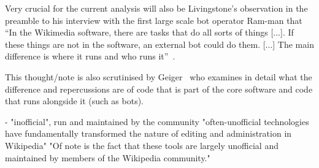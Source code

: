 Very crucial for the current analysis will also be Livingstone's observation in the preamble to his interview with the first large scale bot operator Ram-man that
``In the Wikimedia software, there are tasks that do all sorts of things [...].
If these things are not in the software, an external bot could do them. [...]
The main difference is where it runs and who runs it''~\cite{Livingstone2016}.

This thought/note is also scrutinised by Geiger~\cite{Geiger2014} who examines in detail what the difference and repercussions are of code that is part of the core software and code that runs alongside it (such as bots). %

- "inofficial", run and maintained by the community
    \cite{GeiRib2010}
    "often-unofficial technologies have fundamentally
    transformed the nature of editing and administration in
    Wikipedia"
    "Of note is the fact that these tools are largely
    unofficial and maintained by members of the Wikipedia
    community."

